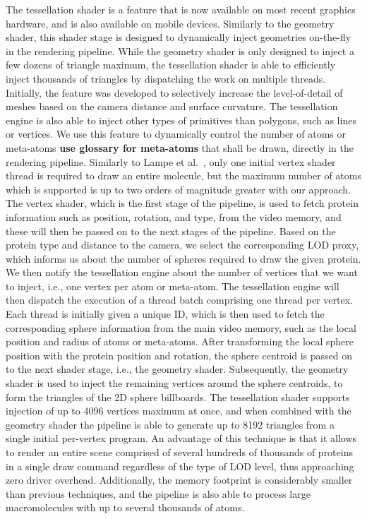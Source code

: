 The tessellation shader is a feature that is now available on most recent graphics hardware, and is also available on mobile devices.
Similarly to the geometry shader, this shader stage is designed to dynamically inject geometries on-the-fly in the rendering pipeline.
While the geometry shader is only designed to inject a few dozens of triangle maximum, the tessellation shader is able to efficiently inject thousands of triangles by dispatching the work on multiple threads.
Initially, the feature was developed to selectively increase the level-of-detail of meshes based on the camera distance and surface curvature.
The tessellation engine is also able to inject other types of primitives than polygons, such as lines or vertices.
We use this feature to dynamically control the number of atoms or meta-atoms \textbf{use glossary for meta-atoms} that shall be drawn, directly in the rendering pipeline.
Similarly to Lampe et al.~\cite{lampe2007two}, only one initial vertex shader thread is required to draw an entire molecule, but the maximum number of atoms which is supported is up to two orders of magnitude greater with our approach.
The vertex shader, which is the first stage of the pipeline, is used to fetch protein information such as position, rotation, and type, from the video memory, and these will then be passed on to the next stages of the pipeline.
Based on the protein type and distance to the camera, we select the corresponding LOD proxy, which informs us about the number of spheres required to draw the given protein.
We then notify the tessellation engine about the number of vertices that we want to inject, i.e., one vertex per atom or meta-atom.
The tessellation engine will then dispatch the execution of a thread batch comprising one thread per vertex.
Each thread is initially given a unique ID, which is then used to fetch the corresponding sphere information from the main video memory, such as the local position and radius of atoms or meta-atoms.
After transforming the local sphere position with the protein position and rotation, the sphere centroid is passed on to the next shader stage, i.e., the geometry shader.
Subsequently, the geometry shader is used to inject the remaining vertices around the sphere centroids, to form the triangles of the 2D sphere billboards.
The tessellation shader supports injection of up to 4096 vertices maximum at once, and when combined with the geometry shader the pipeline is able to generate up to 8192 triangles from a single initial per-vertex program.
An advantage of this technique is that it allows to render an entire scene comprised of several hundreds of thousands of proteins in a single draw command regardless of the type of LOD level, thus approaching zero driver overhead.
Additionally, the memory footprint is considerably smaller than previous techniques, and the pipeline is also able to process large macromolecules with up to several thousands of atoms.

